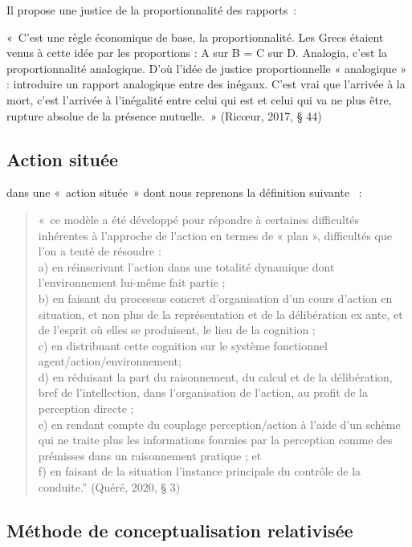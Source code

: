 \documentclass[
  letterpaper,
  DIV=11,
  numbers=noendperiod]{scrreprt}
\begin{document}
Il propose une justice de la proportionnalité des rapports~:

«~C'est une règle économique de base, la proportionnalité. Les Grecs
étaient venus à cette idée par les proportions : A sur B = C sur D.
Analogia, c'est la proportionnalité analogique. D'où l'idée de justice
proportionnelle « analogique » : introduire un rapport analogique entre
des inégaux. C'est vrai que l'arrivée à la mort, c'est l'arrivée à
l'inégalité entre celui qui est et celui qui va ne plus être, rupture
absolue de la présence mutuelle.~» (Ricœur, 2017, § 44)

\hypertarget{actionSitue}{%
\subsection{Action située}\label{actionSitue}}

dans une «~action située~» dont nous reprenons la définition suivante ~:

\begin{quote}
«~ce modèle a été développé pour répondre à certaines difficultés
inhérentes à l'approche de l'action en termes de « plan », difficultés
que l'on a tenté de résoudre :\\
a) en réinscrivant l'action dans une totalité dynamique dont
l'environnement lui-même fait partie ;\\
b) en faisant du processus concret d'organisation d'un cours d'action en
situation, et non plus de la représentation et de la délibération ex
ante, et de l'esprit où elles se produisent, le lieu de la cognition ;\\
c) en distribuant cette cognition sur le système fonctionnel
agent/action/environnement;\\
d) en réduisant la part du raisonnement, du calcul et de la
délibération, bref de l'intellection, dans l'organisation de l'action,
au profit de la perception directe ;\\
e) en rendant compte du couplage perception/action à l'aide d'un schème
qui ne traite plus les informations fournies par la perception comme des
prémisses dans un raisonnement pratique ; et\\
f) en faisant de la situation l'instance principale du contrôle de la
conduite.'' (Quéré, 2020, § 3)
\end{quote}

\hypertarget{muxe9thode-de-conceptualisation-relativisuxe9e}{%
\subsection{Méthode de conceptualisation
relativisée}\label{muxe9thode-de-conceptualisation-relativisuxe9e}}
\end{document}

